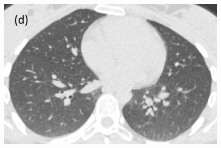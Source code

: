 \documentclass[]{spie}  %
\begin{document}
{\begin{figure}[htbp]
\begin{subfigure}
{\begin{minipage}[t]{0.2\linewidth}
  \includegraphics[width=\linewidth,trim={{.0\wd0} {.0\wd0} {.0\wd0} {.0\wd0}},clip]{Image/H1335_FRC_Raw_Axial.png}
  \centerline{}
	\end{minipage}%
   }%
  \label{fig:HLASegmentationResults-d} 
\end{subfigure}
\begin{subfigure}{
  \begin{minipage}[t]{0.2\linewidth}

\end{minipage}}
\end{subfigure}
\end{figure}}
\end{document}
